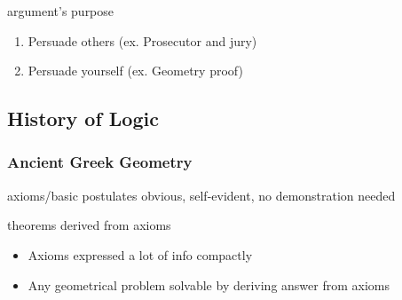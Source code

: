 \begin{description}
	\item[argument's purpose]
\end{description}
\begin{enumerate}
	\item Persuade others (ex. Prosecutor and jury)
	\item Persuade yourself (ex. Geometry proof)
\end{enumerate}

\subsection{History of Logic}
\subsubsection{Ancient Greek Geometry}
\begin{enumdescription}
	\item[axioms/basic postulates] obvious, self-evident, no demonstration
	needed
	\item[theorems] derived from axioms
\end{enumdescription}
\begin{itemize}
	\item Axioms expressed a lot of info compactly
	\item Any geometrical problem solvable by deriving answer from axioms
\end{itemize}

